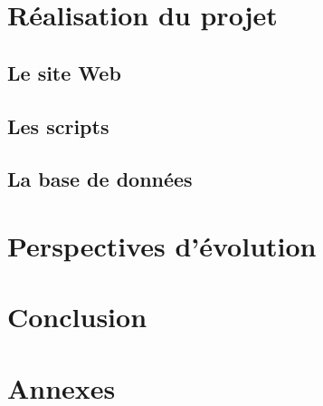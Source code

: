\documentclass[12pt,a4paper]{article}
\begin{document}
\section{Réalisation du projet}
\subsection{Le site Web}
\subsection{Les scripts}
\subsection{La base de données}
\newpage
\section{Perspectives d'évolution}
\newpage
\section{Conclusion}
\newpage
\section{Annexes}
\end{document}
